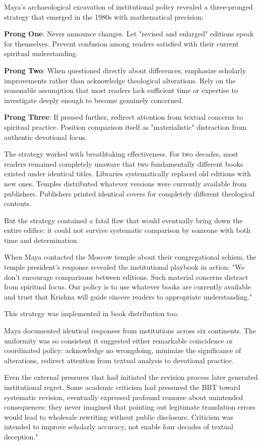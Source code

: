 \documentclass[12pt,twoside]{book}
\begin{document}
Maya's archaeological excavation of institutional policy revealed a three-pronged strategy that emerged in the 1980s with mathematical precision:

\textbf{\textbf{Prong One}}: Never announce changes. Let "revised and enlarged" editions speak for themselves. Prevent confusion among readers satisfied with their current spiritual understanding.

\textbf{\textbf{Prong Two}}: When questioned directly about differences, emphasize scholarly improvements rather than acknowledge theological alterations. Rely on the reasonable assumption that most readers lack sufficient time or expertise to investigate deeply enough to become genuinely concerned.

\textbf{\textbf{Prong Three}}: If pressed further, redirect attention from textual concerns to spiritual practice. Position comparison itself as "materialistic" distraction from authentic devotional focus.

The strategy worked with breathtaking effectiveness. For two decades, most readers remained completely unaware that two fundamentally different books existed under identical titles. Libraries systematically replaced old editions with new ones. Temples distributed whatever versions were currently available from publishers. Publishers printed identical covers for completely different theological contents.

But the strategy contained a fatal flaw that would eventually bring down the entire edifice: it could not survive systematic comparison by someone with both time and determination.

When Maya contacted the Moscow temple about their congregational schism, the temple president's response revealed the institutional playbook in action: "We don't encourage comparisons between editions. Such material concerns distract from spiritual focus. Our policy is to use whatever books are currently available and trust that Krishna will guide sincere readers to appropriate understanding."

This strategy was implemented in book distribution too.

Maya documented identical responses from institutions across six continents. The uniformity was so consistent it suggested either remarkable coincidence or coordinated policy: acknowledge no wrongdoing, minimize the significance of alterations, redirect attention from textual analysis to devotional practice.

Even the external pressures that had initiated the revision process later generated institutional regret. Some academic criticism had pressured the BBT toward systematic revision, eventually expressed profound remorse about unintended consequences: they never imagined that pointing out legitimate translation errors would lead to wholesale rewriting without public disclosure. Criticism was intended to improve scholarly accuracy, not enable four decades of textual deception."
\end{document}
